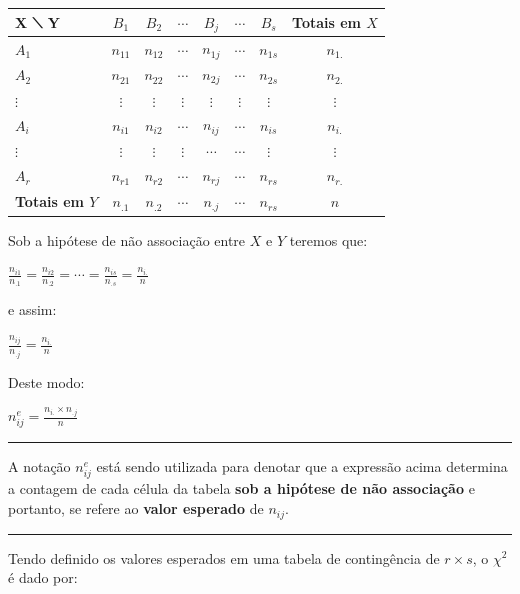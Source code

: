\documentclass[
]{book}
\begin{document}
\begin{longtable}[]{@{}lccccccc@{}}
\toprule
X ⟍ Y & \(B_{1}\) & \(B_{2}\) & \(\cdots\) & \(B_{j}\) & \(\cdots\) & \(B_{s}\) & Totais em \(X\) \\
\midrule
\endhead
\(A_{1}\) & \(n_{11}\) & \(n_{12}\) & \(\cdots\) & \(n_{1j}\) & \(\cdots\) & \(n_{1s}\) & \(n_{1.}\) \\
\(A_{2}\) & \(n_{21}\) & \(n_{22}\) & \(\cdots\) & \(n_{2j}\) & \(\cdots\) & \(n_{2s}\) & \(n_{2.}\) \\
\(\vdots\) & \(\vdots\) & \(\vdots\) & \(\vdots\) & \(\vdots\) & \(\vdots\) & \(\vdots\) & \(\vdots\) \\
\(A_{i}\) & \(n_{i1}\) & \(n_{i2}\) & \(\cdots\) & \(n_{ij}\) & \(\cdots\) & \(n_{is}\) & \(n_{i.}\) \\
\(\vdots\) & \(\vdots\) & \(\vdots\) & \(\vdots\) & \(\cdots\) & \(\cdots\) & \(\vdots\) & \(\vdots\) \\
\(A_{r}\) & \(n_{r1}\) & \(n_{r2}\) & \(\cdots\) & \(n_{rj}\) & \(\cdots\) & \(n_{rs}\) & \(n_{r.}\) \\
\textbf{Totais em \(Y\)} & \(n_{.1}\) & \(n_{.2}\) & \(\cdots\) & \(n_{.j}\) & \(\cdots\) & \(n_{rs}\) & \(n\) \\
\bottomrule
\end{longtable}

Sob a hipótese de não associação entre \(X\) e \(Y\) teremos que:

\(\frac{n_{i1}}{n_{.1}} = \frac{n_{i2}}{n_{.2}} = \cdots = \frac{n_{is}}{n_{.s}} = \frac{n_{i.}}{n}\)

e assim:

\(\frac{n_{ij}}{n_{.j}} = \frac{n_{i.}}{n}\)

Deste modo:

\(n_{ij}^{e} = \frac{n_{i.} \times n_{.j}}{n}\)

\begin{center}\rule{0.5\linewidth}{0.5pt}\end{center}

A notação \(n_{ij}^{e}\) está sendo utilizada para denotar que a expressão acima determina a contagem de cada célula da tabela \textbf{sob a hipótese de não associação} e portanto, se refere ao \textbf{valor esperado} de \(n_{ij}\).

\begin{center}\rule{0.5\linewidth}{0.5pt}\end{center}

Tendo definido os valores esperados em uma tabela de contingência de \(r \times s\), o \(\chi^2\) é dado por:
\end{document}
